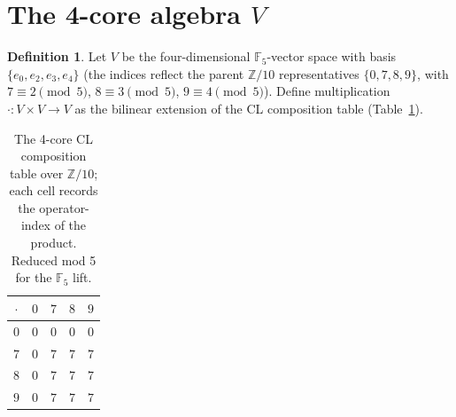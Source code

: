 \documentclass[11pt]{amsart}
\theoremstyle{plain}
\theoremstyle{definition}
\newtheorem{definition}[theorem]{Definition}
\theoremstyle{remark}
\newcommand{\Z}{\mathbb{Z}}
\newcommand{\F}{\mathbb{F}}
\begin{document}
\section{The 4-core algebra $V$}
\label{sec:V}

\begin{definition}\label{def:V}
Let $V$ be the four-dimensional $\F_5$-vector space with basis
$\{e_0, e_2, e_3, e_4\}$ (the indices reflect the parent $\Z/10$ representatives
$\{0,7,8,9\}$, with $7 \equiv 2 \pmod 5$, $8 \equiv 3 \pmod 5$, $9 \equiv 4 \pmod 5$).
Define multiplication $\cdot: V \times V \to V$ as the bilinear extension of
the CL composition table (Table~\ref{tab:CLtable}).
\end{definition}

\begin{table}[h]
\centering
\caption{The 4-core CL composition table over $\Z/10$; each cell records
the operator-index of the product. Reduced mod 5 for the $\F_5$ lift.}
\label{tab:CLtable}
\begin{tabular}{c|cccc}
$\cdot$ & $0$ & $7$ & $8$ & $9$ \\ \hline
$0$ & $0$ & $0$ & $0$ & $0$ \\
$7$ & $0$ & $7$ & $7$ & $7$ \\
$8$ & $0$ & $7$ & $7$ & $7$ \\
$9$ & $0$ & $7$ & $7$ & $7$ \\
\end{tabular}
\end{table}
\end{document}
